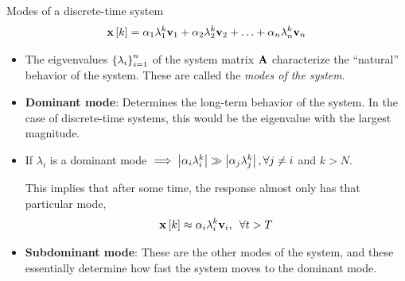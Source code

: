 \documentclass[aspectratio=169]{beamer}
\def\mf{\ensuremath\mathbf}
\def\lv{\ensuremath\left\lvert}
\def\rv{\ensuremath\right\rvert}
\def\lc{\ensuremath\left\{}
\def\rc{\ensuremath\right\}}
\def\ls{\ensuremath\left[}
\def\rs{\ensuremath\right]}
\newcommand{\dt}[1]{\ls #1\rs}
\begin{document}
\begin{frame}{Modes of a discrete-time system}
\vspace{-0.5cm}
\[ \mf{x}\dt{k} = \alpha_1 \lambda_1^k\mf{v}_1 + \alpha_2 \lambda_2^k\mf{v}_2 + \ldots + \alpha_n \lambda_n^k\mf{v}_n\]
\vspace{-0.5cm}

\begin{itemize}
    \item The eigvenvalues $\lc \lambda_i\rc_{i=1}^n$ of the system matrix $\mf{A}$ characterize the ``natural'' behavior of the system. These are called the \textit{modes of the system}.

    \item \textbf{Dominant mode}: Determines the long-term behavior of the system. In the case of discrete-time systems, this would be the eigenvalue with the largest magnitude.

    \item If $\lambda_i$ is a dominant mode $\implies \lv \alpha_i \lambda_i^k \rv \gg \lv \alpha_j \lambda_j^k \rv, \forall j \neq i$ and $k > N$.

    This implies that after some time, the response almost only has that particular mode,
    \[ \mf{x}\dt{k} \approx \alpha_i \lambda_i^k\mf{v}_i, \,\,\, \forall t > T \]

    \item \textbf{Subdominant mode}: These are the other modes of the system, and these essentially determine how fast the system moves to the dominant mode.
\end{itemize}
\end{frame}
\end{document}
